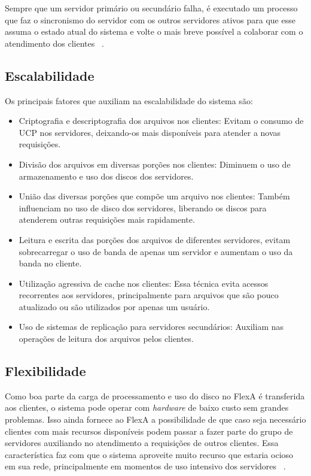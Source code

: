         Sempre que um servidor primário ou secundário falha, é executado um processo que faz o sincronismo do servidor com os outros servidores ativos para que esse assuma o estado atual do sistema e volte o mais breve possível a colaborar com o atendimento dos clientes ~\cite{silas}.
        
    
    \subsection{Escalabilidade}
    
        Os principais fatores que auxiliam na escalabilidade do sistema são:
        
        \begin{itemize}
            \item Criptografia e descriptografia dos arquivos nos clientes: Evitam o consumo de UCP nos servidores, deixando-os mais disponíveis para atender a novas requisições.
            \item Divisão dos arquivos em diversas porções nos clientes: Diminuem o uso de armazenamento e uso dos discos dos servidores.
            \item União das diversas porções que compõe um arquivo nos clientes: Também influenciam no uso de disco dos servidores, liberando os discos para atenderem outras requisições mais rapidamente.
            \item Leitura e escrita das porções dos arquivos de diferentes servidores, evitam sobrecarregar o uso de banda de apenas um servidor e aumentam o uso da banda no cliente.
            \item Utilização agressiva de cache nos clientes: Essa técnica evita acessos recorrentes aos servidores, principalmente para arquivos que são pouco atualizado ou são utilizados por apenas um usuário.
            \item Uso de sistemas de replicação para servidores secundários: Auxiliam nas operações de leitura dos arquivos pelos clientes.
        \end{itemize}
        
        
    \subsection{Flexibilidade}
    
        Como boa parte da carga de processamento e uso do disco no FlexA é transferida aos clientes, o sistema pode operar com \textit{hardware} de baixo custo sem grandes problemas. Isso ainda fornece ao FlexA a possibilidade de que caso seja necessário clientes com mais recursos disponíveis podem passar a fazer parte do grupo de servidores auxiliando no atendimento a requisições de outros clientes. Essa característica faz com que o sistema aproveite muito recurso que estaria ocioso em sua rede, principalmente em momentos de uso intensivo dos servidores ~\cite{silas}.
        
